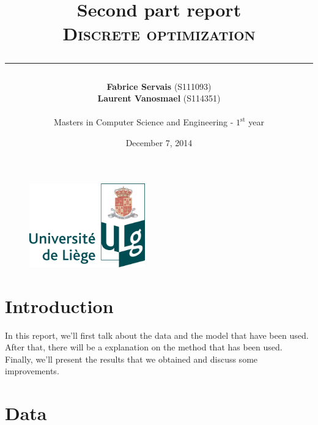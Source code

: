 \documentclass[a4paper,titlepage]{article}
\begin{document}
\begin{titlepage}

\begin{figure}
\centering
\includegraphics[width=5cm]{logo-ulg.png}
\end{figure}



\title{
\vspace{0.2cm}
\LARGE{\textbf{Second part report}} \\ \textsc{Discrete optimization}
\author{\textbf{Fabrice Servais} \small{(S111093})\\\textbf{Laurent Vanosmael} \small{(S114351}) \\ \\ Masters in Computer Science and Engineering - $1^{\text{st}}$ year}
\date{December 7, 2014}
\rule{15cm}{1.5pt}
}

\end{titlepage}

\pagestyle{fancy}

\maketitle

\section{Introduction}
In this report, we'll first talk about the data and the model that have been used. After that, there will be a explanation on the method that has been used. Finally, we'll present the results that we obtained and discuss some improvements.


\section{Data}
\end{document}
